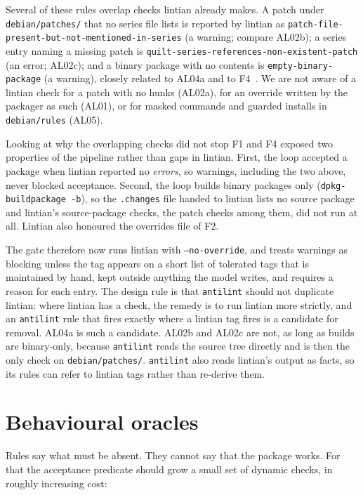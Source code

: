 \documentclass[11pt]{article}
\newcommand{\file}[1]{\texttt{#1}}
\begin{document}
\begin{sloppypar}
Several of these rules overlap checks lintian already makes. A patch
under \file{debian/patches/} that no series file lists is reported by
lintian as \texttt{patch-file-present-but-not-mentioned-in-series}
(a warning; compare AL02b); a series entry naming a missing patch is
\texttt{quilt-series-references-non-existent-patch} (an error; AL02c);
and a binary package with no contents is
\texttt{empty-binary-package} (a warning), closely related to AL04a
and to F4~\cite{lintian}. We are not aware of a lintian check for a
patch with no hunks (AL02a), for an override written by the packager
as such (AL01), or for masked commands and guarded installs in
\file{debian/rules} (AL05).
\end{sloppypar}

Looking at why the overlapping checks did not stop F1 and F4 exposed
two properties of the pipeline rather than gaps in lintian. First, the
loop accepted a package when lintian reported no \emph{errors}, so
warnings, including the two above, never blocked acceptance. Second,
the loop builds binary packages only (\texttt{dpkg-buildpackage -b}),
so the \file{.changes} file handed to lintian lists no source package
and lintian's source-package checks, the patch checks among them, did
not run at all. Lintian also honoured the overrides file of F2.

The gate therefore now runs lintian with \texttt{--no-override}, and
treats warnings as blocking unless the tag appears on a short list of
tolerated tags that is maintained by hand, kept outside anything the
model writes, and requires a reason for each entry. The design rule is
that \texttt{antilint} should not duplicate lintian: where lintian has
a check, the remedy is to run lintian more strictly, and an
\texttt{antilint} rule that fires exactly where a lintian tag fires is
a candidate for removal. AL04a is such a candidate. AL02b and AL02c
are not, as long as builds are binary-only, because \texttt{antilint}
reads the source tree directly and is then the only check on
\file{debian/patches/}. \texttt{antilint} also reads lintian's output
as facts, so its rules can refer to lintian tags rather than
re-derive them.

\section{Behavioural oracles}

Rules say what must be absent. They cannot say that the package works. For
that the acceptance predicate should grow a small set of dynamic checks, in
roughly increasing cost:
\end{document}
